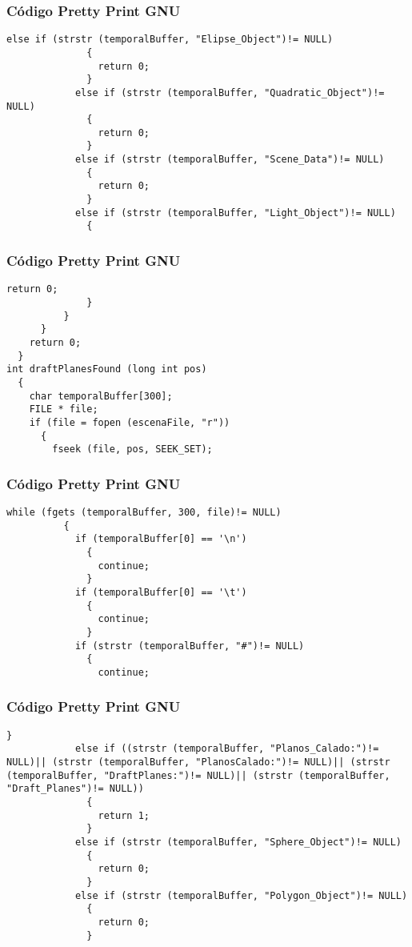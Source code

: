 \documentclass{beamer}
\begin{document}
\begin{frame}[fragile]
\frametitle{C\'odigo Pretty Print GNU}
\begin{lstlisting}[style=CStyle]
            else if (strstr (temporalBuffer, "Elipse_Object")!= NULL)
              {
                return 0;
              }
            else if (strstr (temporalBuffer, "Quadratic_Object")!= NULL)
              {
                return 0;
              }
            else if (strstr (temporalBuffer, "Scene_Data")!= NULL)
              {
                return 0;
              }
            else if (strstr (temporalBuffer, "Light_Object")!= NULL)
              {
                \end{lstlisting}
\end{frame}
\begin{frame}[fragile]
\frametitle{C\'odigo Pretty Print GNU}
\begin{lstlisting}[style=CStyle]
                return 0;
              }
          }
      }
    return 0;
  }
int draftPlanesFound (long int pos)
  {
    char temporalBuffer[300];
    FILE * file;
    if (file = fopen (escenaFile, "r"))
      {
        fseek (file, pos, SEEK_SET);
\end{lstlisting}
\end{frame}
\begin{frame}[fragile]
\frametitle{C\'odigo Pretty Print GNU}
\begin{lstlisting}[style=CStyle]
        while (fgets (temporalBuffer, 300, file)!= NULL)
          {
            if (temporalBuffer[0] == '\n')
              {
                continue;
              }
            if (temporalBuffer[0] == '\t')
              {
                continue;
              }
            if (strstr (temporalBuffer, "#")!= NULL)
              {
                continue;
\end{lstlisting}
\end{frame}
\begin{frame}[fragile]
\frametitle{C\'odigo Pretty Print GNU}
\begin{lstlisting}[style=CStyle]
              }
            else if ((strstr (temporalBuffer, "Planos_Calado:")!= NULL)|| (strstr (temporalBuffer, "PlanosCalado:")!= NULL)|| (strstr (temporalBuffer, "DraftPlanes:")!= NULL)|| (strstr (temporalBuffer, "Draft_Planes")!= NULL))
              {
                return 1;
              }
            else if (strstr (temporalBuffer, "Sphere_Object")!= NULL)
              {
                return 0;
              }
            else if (strstr (temporalBuffer, "Polygon_Object")!= NULL)
              {
                return 0;
              }
\end{lstlisting}
\end{frame}
\end{document}
